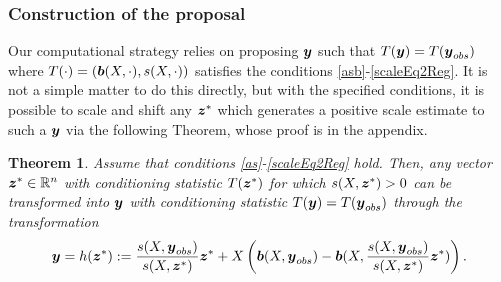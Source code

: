 \documentclass[12pt]{article}
\newcommand{\by}{\mbox{\boldmath $y$}}
\newcommand{\bz}{\mbox{\boldmath $z$}}
\newcommand{\bb}{\mbox{\boldmath $b$}}
\newtheorem{theorem}{Theorem}[section]
\begin{document}
\subsubsection{Construction of the proposal}
Our computational strategy relies on proposing $\by$ such that $T(\by) = T(\by_{obs})$ where $T(\cdot) = (\bb(X, \cdot), s(X, \cdot))$ satisfies the conditions \ref{asb}-\ref{scaleEq2Reg}. It is not a simple matter to do this directly, but with the specified conditions, it is possible to scale and shift any $\bz^{*}$ which generates 
a positive scale estimate to such a $\by$ via the following Theorem, whose proof is in the appendix. 
\begin{theorem}
\label{Transformation}
Assume that conditions \ref{as}-\ref{scaleEq2Reg} hold.  Then, any vector $\bz^* \in \mathbb{R}^n$ with conditioning statistic
$T(\bz^*)$ for which $s(X,\bz^*) > 0$ can be transformed into $\by$ with conditioning statistic $T(\by) = T(\by_{obs})$ 
through the transformation 
\[
\by = h(\bz^*) := \frac{s(X,\by_{obs})}{s(X,\bz^*)} \bz^* + X\left(\bb(X,\by_{obs}) - \bb(X,\frac{s(X,\by_{obs})}{s(X,\bz^*)} \bz^*)\right) .  
\]
\end{theorem}%
\end{document}
